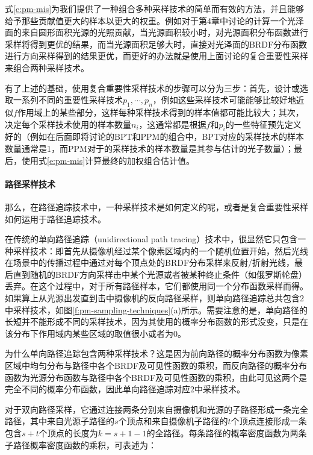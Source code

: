 式\ref{e:pm-mis}为我们提供了一种组合多种采样技术的简单而有效的方法，并且能够给予那些贡献值更大的样本以更大的权重。例如对于第4章中讨论的计算一个光泽面的来自圆形面积光源的光照贡献，当光源面积较小时，对光源面积分布函数进行采样将得到更优的结果，而当光源面积足够大时，直接对光泽面的BRDF分布函数进行方向采样得到的结果更优，而更好的办法就是使用上面讨论的复合重要性采样来组合两种采样技术。

有了上述的基础，使用复合重要性采样技术的步骤可以分为三步：首先，设计或选取一系列不同的重要性采样技术$p_1,\cdots,p_n$，例如这些采样技术可能能够比较好地近似$f$作用域上的某些部分，这样每种采样技术得到的样本值都可能比较大；其次，决定每个采样技术使用的样本数量$n_i$，这通常都是根据$f$和$p_i$的一些特征预先定义好的（例如在后面即将讨论的BPT和PPM的组合中，BPT对应的采样技术的样本数量通常是1，而PPM对于的采样技术的样本数量是其参与估计的光子数量）；最后，使用式\ref{e:pm-mis}计算最终的加权组合估计值。




\paragraph{路径采样技术}
那么，在路径追踪技术中，一种采样技术是如何定义的呢，或者是复合重要性采样如何运用于路径追踪技术。

在传统的单向路径追踪（unidirectional path tracing）技术中，很显然它只包含一种采样技术：即首先从摄像机经过某个像素区域内的一个随机位置开始，然后光线在场景中的传播过程中通过对每个顶点处的BRDF分布采样来反射/折射光线，最后直到随机的BRDF方向采样击中某个光源或者被某种终止条件（如俄罗斯轮盘）丢弃。在这个过程中，对于所有路径样本，它们都使用同一个分布函数采样而得。如果算上从光源出发直到击中摄像机的反向路径采样，则单向路径追踪总共包含2中采样技术，如图\ref{f:pm-sampling-techniques}(a)所示。需要注意的是，单向路径的长短并不能形成不同的采样技术，因为其使用的概率分布函数的形式没变，只是在该分布下作用域内某些区域的取值很小或者为0。

\begin{myshaded}
	为什么单向路径追踪包含两种采样技术？这是因为前向路径的概率分布函数为像素区域中均匀分布与路径中各个BRDF及可见性函数的乘积，而反向路径的概率分布函数为光源分布函数与路径中各个BRDF及可见性函数的乘积，由此可见这两个是完全不同的概率分布函数，因此单向路径追踪对应2中采样技术。
\end{myshaded}

对于双向路径采样，它通过连接两条分别来自摄像机和光源的子路径形成一条完全路径，其中来自光源子路径的$s$个顶点和来自摄像机子路径的$t$个顶点连接形成一条包含$s+t$个顶点的长度为$k=s+1-1$的全路径。每条路径的概率密度函数为两条子路径概率密度函数的乘积，可表述为：


